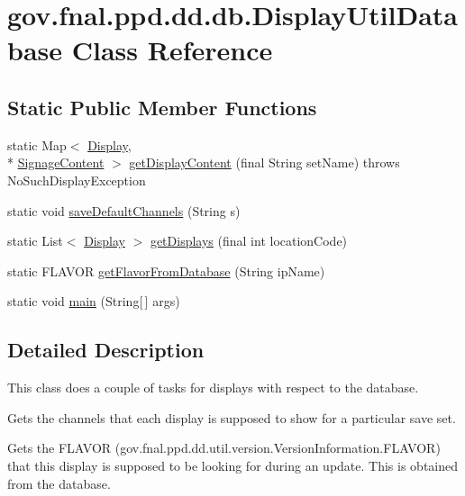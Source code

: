 \hypertarget{classgov_1_1fnal_1_1ppd_1_1dd_1_1db_1_1DisplayUtilDatabase}{\section{gov.\-fnal.\-ppd.\-dd.\-db.\-Display\-Util\-Database Class Reference}
\label{classgov_1_1fnal_1_1ppd_1_1dd_1_1db_1_1DisplayUtilDatabase}
}
\subsection*{Static Public Member Functions}
\begin{DoxyCompactItemize}
\item 
static Map$<$ \hyperlink{interfacegov_1_1fnal_1_1ppd_1_1dd_1_1signage_1_1Display}{Display}, \\*
\hyperlink{interfacegov_1_1fnal_1_1ppd_1_1dd_1_1signage_1_1SignageContent}{Signage\-Content} $>$ \hyperlink{classgov_1_1fnal_1_1ppd_1_1dd_1_1db_1_1DisplayUtilDatabase_a446a9bd0e9237759231cd69e51c309f1}{get\-Display\-Content} (final String set\-Name)  throws No\-Such\-Display\-Exception 
\item 
static void \hyperlink{classgov_1_1fnal_1_1ppd_1_1dd_1_1db_1_1DisplayUtilDatabase_af822fc88bb63cd8996c336f75e550813}{save\-Default\-Channels} (String s)
\item 
static List$<$ \hyperlink{interfacegov_1_1fnal_1_1ppd_1_1dd_1_1signage_1_1Display}{Display} $>$ \hyperlink{classgov_1_1fnal_1_1ppd_1_1dd_1_1db_1_1DisplayUtilDatabase_af34cf8a1aba7561cc426fa40461042db}{get\-Displays} (final int location\-Code)
\item 
static F\-L\-A\-V\-O\-R \hyperlink{classgov_1_1fnal_1_1ppd_1_1dd_1_1db_1_1DisplayUtilDatabase_af00bdcfa3338d983d8d54c1feb5eb1b5}{get\-Flavor\-From\-Database} (String ip\-Name)
\item 
static void \hyperlink{classgov_1_1fnal_1_1ppd_1_1dd_1_1db_1_1DisplayUtilDatabase_abf232a2d04f1ff79ab71b796aa891164}{main} (String\mbox{[}$\,$\mbox{]} args)
\end{DoxyCompactItemize}


\subsection{Detailed Description}
This class does a couple of tasks for displays with respect to the database. 
\begin{DoxyEnumerate}
\item Gets the channels that each display is supposed to show for a particular save set. 
\item Gets the F\-L\-A\-V\-O\-R (gov.\-fnal.\-ppd.\-dd.\-util.\-version.\-Version\-Information.\-F\-L\-A\-V\-O\-R) that this display is supposed to be looking for during an update. This is obtained from the database. 
\end{DoxyEnumerate}

